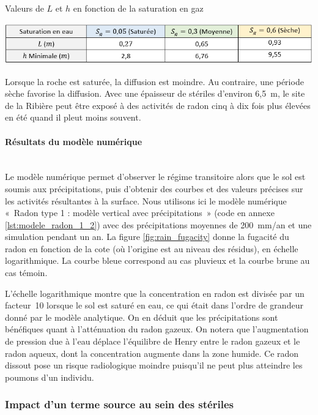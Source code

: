 \documentclass{article}
\begin{document}
\begin{table}[H]
    \centering
    \caption{Valeurs de $L$ et $h$ en fonction de la saturation en gaz}
    \includegraphics[width = \linewidth]{III_C_4.png}
    \label{tab:tableau_saturation}
\end{table}

Lorsque la roche est saturée, la diffusion est moindre. Au contraire, une période sèche favorise la diffusion. Avec une épaisseur de stériles d'environ 6,5~m, le site de la Ribière peut être exposé à des activités de radon cinq à dix fois plus élevées en été quand il pleut moins souvent.

\paragraph{Résultats du modèle numérique \\ \\} Le modèle numérique permet d’observer le régime transitoire alors que le sol est soumis aux précipitations, puis d'obtenir des courbes et des valeurs précises sur les activités résultantes à la surface. Nous utilisons ici le modèle numérique «~Radon type 1 : modèle vertical avec précipitations~» (code en annexe \ref{lst:modele_radon_1_2}) avec des précipitations moyennes de 200~mm/an et une simulation pendant un an. La figure \ref{fig:rain_fugacity} donne la fugacité du radon en fonction de la cote (où l'origine est au niveau des résidus), en échelle logarithmique. La courbe bleue correspond au cas pluvieux et la courbe brune au cas témoin.

L’échelle logarithmique montre que la concentration en radon est divisée par un facteur~10 lorsque le sol est saturé en eau, ce qui était dans l'ordre de grandeur donné par le modèle analytique. On en déduit que les précipitations sont bénéfiques quant à l’atténuation du radon gazeux. On notera que l'augmentation de pression due à l'eau déplace l’équilibre de Henry entre le radon gazeux et le radon aqueux, dont la concentration augmente dans la zone humide. Ce radon dissout pose un risque radiologique moindre puisqu'il ne peut plus atteindre les poumons d'un individu.


\subsubsection{Impact d'un terme source au sein des stériles}
\end{document}
